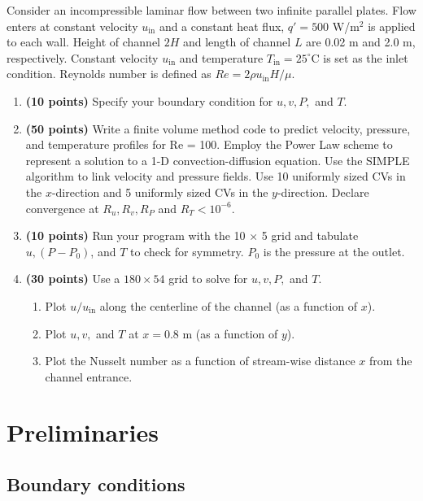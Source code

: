 \documentclass{article}
\begin{document}
Consider an incompressible laminar flow between two infinite parallel plates. Flow enters at constant velocity $u_\mathrm{in}$ and a constant heat flux, $q' = 500$ W/m$^2$ is applied to each wall. Height of channel $2H$ and length of channel $L$ are 0.02 m and 2.0 m, respectively. Constant velocity $u_\mathrm{in}$ and temperature $T_\mathrm{in} = 25^\circ$C is set as the inlet condition. Reynolds number is defined as $Re = 2 \rho u_\mathrm{in} H / \mu$.
\begin{enumerate}
	\item \textbf{(10 points)} Specify your boundary condition for $u, v, P,$ and $T$.
	\item \textbf{(50 points)} Write a finite volume method code to predict velocity, pressure, and temperature profiles for Re = 100. Employ the Power Law scheme to represent a solution to a 1-D convection-diffusion equation. Use the SIMPLE algorithm to link velocity and pressure fields. Use 10 uniformly sized CVs in the $x$-direction and 5 uniformly sized CVs in the $y$-direction. Declare convergence at $R_u, R_v, R_P$ and $R_T < 10^{-6}$. 
	\item \textbf{(10 points)} Run your program with the 10 $\times$ 5 grid and tabulate $u, (P - P_0)$, and $T$ to check for symmetry. $P_0$ is the pressure at the outlet.
	\item \textbf{(30 points)} Use a $180 \times 54$ grid to solve for $u, v, P,$ and $T$.
	\begin{enumerate}[label=(\alph*)]
		\item Plot $u/u_\mathrm{in}$ along the centerline of the channel (as a function of $x$).
		\item Plot $u, v,$ and $T$ at $x = 0.8$ m (as a function of $y$).
		\item Plot the Nusselt number as a function of stream-wise distance $x$ from the channel entrance.
	\end{enumerate}
\end{enumerate}

\section{Preliminaries}

\subsection{Boundary conditions}
\end{document}
